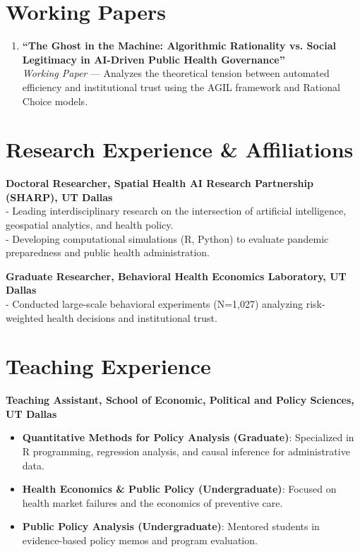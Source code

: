 \documentclass[11pt]{article}
\begin{document}
\section*{Working Papers}
\begin{enumerate}
    \item \textbf{``The Ghost in the Machine: Algorithmic Rationality vs. Social Legitimacy in AI-Driven Public Health Governance''} \\
    \textit{Working Paper} --- Analyzes the theoretical tension between automated efficiency and institutional trust using the AGIL framework and Rational Choice models.
\end{enumerate}

\section*{Research Experience \& Affiliations}
\textbf{Doctoral Researcher, Spatial Health AI Research Partnership (SHARP), UT Dallas} \\
- Leading interdisciplinary research on the intersection of artificial intelligence, geospatial analytics, and health policy. \\
- Developing computational simulations (R, Python) to evaluate pandemic preparedness and public health administration.

\vspace{0.5em}
\noindent \textbf{Graduate Researcher, Behavioral Health Economics Laboratory, UT Dallas} \\
- Conducted large-scale behavioral experiments (N=1,027) analyzing risk-weighted health decisions and institutional trust.

\section*{Teaching Experience}
\textbf{Teaching Assistant, School of Economic, Political and Policy Sciences, UT Dallas}
\begin{itemize}[noitemsep, topsep=0pt]
    \item \textbf{Quantitative Methods for Policy Analysis (Graduate)}: Specialized in R programming, regression analysis, and causal inference for administrative data.
    \item \textbf{Health Economics \& Public Policy (Undergraduate)}: Focused on health market failures and the economics of preventive care.
    \item \textbf{Public Policy Analysis (Undergraduate)}: Mentored students in evidence-based policy memos and program evaluation.
\end{itemize}
\end{document}
